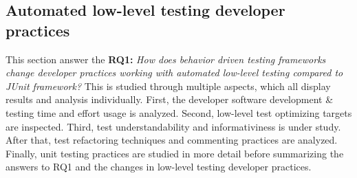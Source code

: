 \subsection{Automated low-level testing developer practices}
This section answer the
\textbf{RQ1: }\textit{How does behavior driven testing frameworks change developer practices working with automated
low-level testing compared to JUnit framework?} This is studied through multiple aspects, which all display results and analysis
individually. First, the developer software development \& testing time and effort usage is analyzed. Second, low-level
test optimizing targets are inspected. Third, test understandability and informativiness is under study. After that, test
refactoring techniques and commenting practices are analyzed. Finally, unit testing practices are studied in more detail
before summarizing the answers to RQ1 and the changes in low-level testing developer practices.

